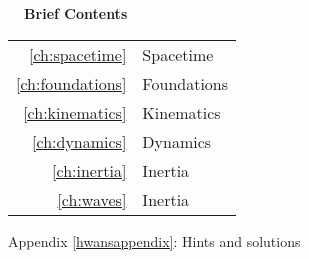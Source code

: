 \documentclass{sr}
\begin{document}


\cleardoublepage





\pagebreak\vspace{100mm}

\hbox{}\noindent\huge\bfseries\sffamily{}\hspace{-2mm}\ \ Brief Contents\\
\hspace{-20mm}\noindent\mynormaltype\Large\sffamily{}\begin{tabular}{rl}
\ref{ch:spacetime} & Spacetime \quad \pageref{ch:spacetime}\\
\ref{ch:foundations} & Foundations \quad \pageref{ch:foundations}\\
\ref{ch:kinematics} & Kinematics \quad \pageref{ch:kinematics}\\
\ref{ch:dynamics} & Dynamics \quad \pageref{ch:dynamics}\\
\ref{ch:inertia} & Inertia \quad \pageref{ch:inertia}\\
\ref{ch:waves} & Inertia \quad \pageref{ch:waves}\\
\end{tabular}
\mynormaltype

\vspace{100mm}\pagebreak

\cleardoublepage

\mynormaltype

\tableofcontents

{\sffamily{} Appendix \ref{hwansappendix}: Hints and solutions                      \dotfill \pageref{hwansappendix}}

\mainmatter
  \addtocounter{page}{8} 
\parafmt
\myeqnspacing %
	\renewcommand{\chapdir}{ch01}
	\renewcommand{\chapdir}{ch02}
	\renewcommand{\chapdir}{ch03}
	\renewcommand{\chapdir}{ch04}
	\renewcommand{\chapdir}{ch05}
	\formatchtoc{\large}{\quad\contentspage}{4mm} %
	\renewcommand{\chapdir}{ch06}
\end{document}
